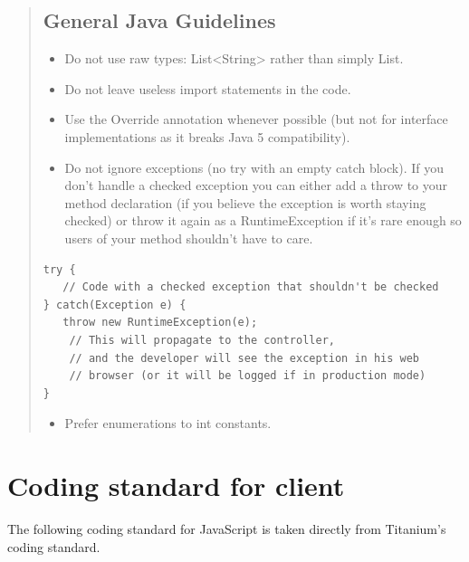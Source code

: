 \documentclass[11pt]{book}
\begin{document}
\begin{quotation}
\subsection{General Java Guidelines}
\begin{itemize}
    \item Do not use raw types: List<String> rather than simply List.
    \item Do not leave useless import statements in the code.
    \item Use the Override annotation whenever possible (but not for interface implementations as it breaks Java 5 compatibility).
    \item Do not ignore exceptions (no try with an empty catch block). If you don't handle a checked exception you can either add a throw to your method declaration (if you believe the exception is worth staying checked) or throw it again as a RuntimeException if it's rare enough so users of your method shouldn't have to care.
\end{itemize}
\begin{lstlisting}[frame=single]
try {
   // Code with a checked exception that shouldn't be checked
} catch(Exception e) {
   throw new RuntimeException(e);
    // This will propagate to the controller,
    // and the developer will see the exception in his web
    // browser (or it will be logged if in production mode)
}
\end{lstlisting}
\begin{itemize}
    \item Prefer enumerations to int constants.
\end{itemize}
\end{quotation}

\section{Coding standard for client}
The following coding standard for JavaScript is taken directly from Titanium's coding standard\cite{titaniumCodingStandard}.
\end{document}
